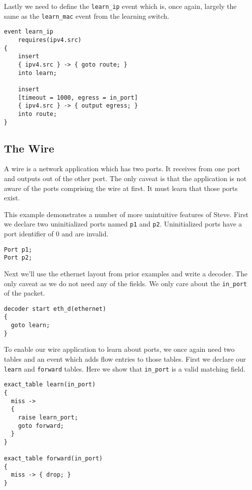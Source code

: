 Lastly we need to define the \texttt{learn\_ip} event which is, once again, largely the same as the \texttt{learn\_mac} event from the learning switch.

\begin{lstlisting}
event learn_ip
	requires(ipv4.src)
{
	insert
	{ ipv4.src } -> { goto route; }
	into learn;

	insert
	[timeout = 1000, egress = in_port]
	{ ipv4.src } -> { output egress; }
	into route;
}
\end{lstlisting}

\subsection{The Wire} \label{tut:wire}

A wire is a network application which has two ports. It receives from one port and outputs out of the other port. The only caveat is that the application is not aware of the ports comprising the wire at first. It must learn that those ports exist.

This example demonstrates a number of more unintuitive features of Steve. First we declare two uninitialized ports named \texttt{p1} and \texttt{p2}. Uninitialized ports have a port identifier of 0 and are invalid.

\begin{lstlisting}
Port p1;
Port p2;
\end{lstlisting}

Next we'll use the ethernet layout from prior examples and write a decoder. The only caveat as we do not need any of the fields. We only care about the \texttt{in\_port} of the packet.

\begin{lstlisting}
decoder start eth_d(ethernet)
{
  goto learn;
}
\end{lstlisting}

To enable our wire application to learn about ports, we once again need two tables and an event which adds flow entries to those tables. First we declare our \texttt{learn} and \texttt{forward} tables. Here we show that \texttt{in\_port} is a valid matching field.

\begin{lstlisting}
exact_table learn(in_port)
{
  miss -> 
  {
  	raise learn_port;
    goto forward;
  }
}

exact_table forward(in_port)
{
  miss -> { drop; }
}
\end{lstlisting}

